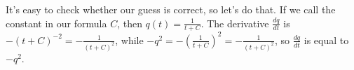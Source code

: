 \documentclass[main]{subfiles}
\begin{document}
\begin{enumerate}[resume]
\begin{enumerate}
\begin{solution}
      It's easy to check whether our guess is correct, so let's do that.
      If we call the constant in our formula $C$, then $q(t) = \frac{1}{t
        + C}$.  The derivative $\frac{dq}{dt}$ is $-(t + C)^{-2} = -
      \frac{1}{(t + C)^2}$, while $-q^2 = - \left( \frac{1}{t + C}
      \right)^2 = - \frac{1}{(t + C)^2}$, so $\frac{dq}{dt}$ is equal to
      $-q^2$.
    \end{solution}

  \end{enumerate}

\end{enumerate}
\end{document}
